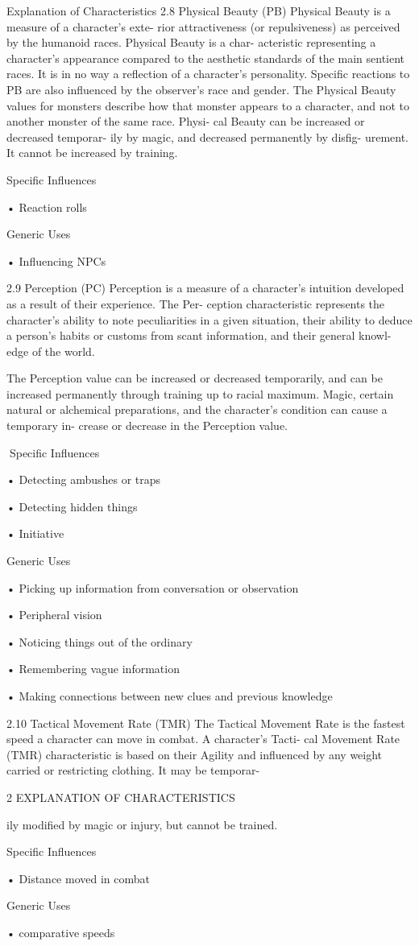 \begin{Chapter}{Explanation of Characteristics}
2.8 Physical Beauty (PB) 
Physical Beauty is a measure of a character’s exte-
rior  attractiveness  (or  repulsiveness)  as  perceived 
by  the  humanoid  races.  Physical  Beauty  is  a  char-
acteristic  representing  a  character’s  appearance 
compared  to  the  aesthetic  standards  of  the  main 
sentient  races.  It  is  in  no  way  a  reflection  of  a 
character’s  personality.  Specific  reactions  to  PB 
are  also  influenced  by  the  observer’s  race  and 
gender.  The  Physical  Beauty  values  for  monsters 
describe  how  that  monster  appears  to  a  character, 
and not to another monster of the same race. Physi-
cal Beauty can be increased or decreased temporar-
ily by magic, and decreased permanently by disfig-
urement. It cannot be increased by training. 

Specific Influences  

• Reaction rolls 

Generic Uses  

• Influencing NPCs 

2.9 Perception (PC) 
Perception  is  a  measure  of  a  character’s  intuition 
developed as a result of their experience. The Per-
ception  characteristic  represents  the  character’s 
ability  to  note  peculiarities  in  a  given  situation, 
their ability to deduce a person’s habits or customs 
from  scant  information,  and  their  general  knowl-
edge of the world. 

The Perception value can be increased or decreased 
temporarily,  and  can  be  increased  permanently 
through  training  up  to  racial  maximum.  Magic, 
certain  natural  or  alchemical  preparations,  and  the 
character’s  condition  can  cause  a  temporary  in-
crease or decrease in the Perception value. 

Specific Influences  

• Detecting ambushes or traps  

• Detecting hidden things  

• Initiative 

Generic Uses  

•  Picking  up  information  from  conversation  or 
observation  

• Peripheral vision  

• Noticing things out of the ordinary  

• Remembering vague information  

•  Making  connections  between  new  clues  and 
previous knowledge 

2.10 Tactical Movement Rate (TMR) 
The Tactical Movement Rate is the fastest speed a 
character can move in combat. A character’s Tacti-
cal  Movement  Rate  (TMR)  characteristic  is  based 
on  their  Agility  and  influenced  by  any  weight 
carried or restricting clothing. It may be temporar-

2 EXPLANATION OF CHARACTERISTICS 

ily  modified  by  magic  or  injury,  but  cannot  be 
trained. 

Specific Influences  

• Distance moved in combat 

Generic Uses  

• comparative speeds 

\end{Chapter}
